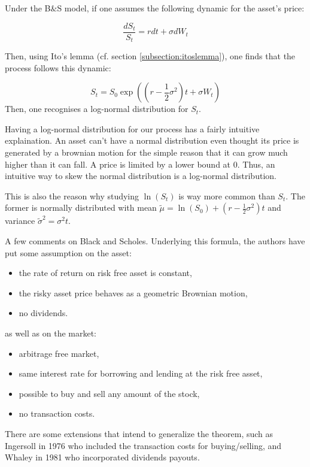 \begin{remarque}
Under the B$\&$S model, if one assumes the following dynamic for the asset's price:

$$ \frac {dS_t}{S_t} = r dt + \sigma dW_t$$

Then, using Ito's lemma (cf. section \ref{subsection:itoslemma}), one finds that the process follows this dynamic:

$$ S_t = S_0 \exp \left ( (r - \frac 1 2 \sigma^2 )t + \sigma W_t \right ) $$
Then, one recognises a log-normal distribution for $S_t$.

Having a log-normal distribution for our process has a fairly intuitive explaination. An asset can't have a normal distribution even thought its price is generated by a brownian motion for the simple reason that it can grow much higher than it can fall. A price is limited by a lower bound at $0$. Thus, an intuitive way to skew the normal distribution is a log-normal distribution. 

This is also the reason why studying $\ln(S_t)$ is way more common than $S_t$. The former is normally distributed with mean $\tilde{\mu} = \ln(S_0) + (r - \frac 1 2 \sigma^2 )t$ and variance $\tilde{\sigma}^2  = \sigma^2 t$.
\end{remarque}


A few comments on Black and Scholes. Underlying this formula, the authors have put some assumption on the asset:

\begin{itemize}
\item the rate of return on risk free asset is constant,
\item  the risky asset price behaves as a geometric Brownian motion,
\item no dividends.
\end{itemize}

as well as on the market:

\begin{itemize}
\item arbitrage free market,
\item same interest rate for borrowing and lending at the risk free asset,
\item possible to buy and sell any amount of the stock,
\item  no transaction costs.
\end{itemize}

There are some extensions that intend to generalize the theorem, such as Ingersoll in 1976 who included the transaction costs for buying/selling, and Whaley in 1981 who incorporated dividends payouts.

